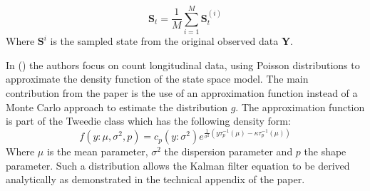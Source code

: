 \begin{equation}
    \textbf{S}_t = \frac{1}{M}\sum_{i=1}^{M} \textbf{S}_t^{(i)}
\end{equation}
Where $\textbf{S}^i$ is the sampled state from the original observed data \textbf{Y}.
\par \vspace{5mm}
In (\cite{jorgsong98}) the authors focus on count longitudinal data, using Poisson distributions to approximate the density function of the state space model. The main contribution from the paper is the use of an approximation function instead of a Monte Carlo approach to estimate the distribution $g$. The approximation function is part of the Tweedie class which has the following density form:
\begin{equation}
    f(y: \mu, \sigma^2, p) = c_p(y: \sigma^2)e^{\frac{1}{\sigma^2}(y\tau_p^{-1}(\mu) - \kappa{\tau_p^{-1}(\mu)})}
\end{equation}
Where $\mu$ is the mean parameter, $\sigma^2$ the dispersion parameter and $p$ the shape parameter.
Such a distribution allows the Kalman filter equation to be derived analytically as demonstrated in the technical appendix of the paper.
